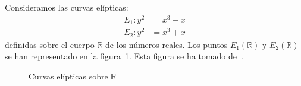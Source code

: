 \begin{ejemplo}
	Consideramos las curvas elípticas:
	\begin{align*}
		E_1: y^2 & = x^3 - x \\
		E_2: y^2 & = x^3 + x
	\end{align*}
	definidas sobre el cuerpo $\mathbb{R}$ de los números reales. Los puntos $E_1(\mathbb{R})$ y $E_2(\mathbb{R})$ se han representado en la figura~\ref{fig:curvas elípticas reales}. Esta figura se ha tomado de~\cite{Hankerson:2003}.

	\begin{figure}[h]
		\myfloatalign
		 \quad
		\caption{Curvas elípticas sobre $\mathbb{R}$}\label{fig:curvas elípticas reales}
	\end{figure}
\end{ejemplo}

